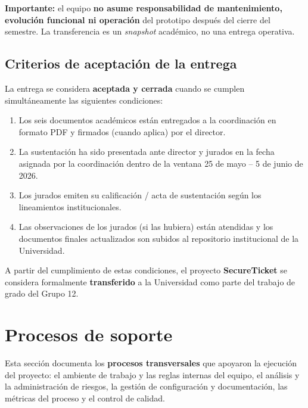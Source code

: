 \documentclass[12pt,oneside]{report}
\newcommand{\projectname}{SecureTicket}
\begin{document}
      \textbf{Importante:} el equipo \textbf{no asume responsabilidad de mantenimiento, evolución funcional ni operación} del prototipo después del cierre del semestre. La transferencia es un \textit{snapshot} académico, no una entrega operativa.

    \subsection{Criterios de aceptación de la entrega}
    \label{subsec:aceptacion-entrega}

      La entrega se considera \textbf{aceptada y cerrada} cuando se cumplen simultáneamente las siguientes condiciones:
      \begin{enumerate}
        \item Los seis documentos académicos están entregados a la coordinación en formato PDF y firmados (cuando aplica) por el director.
        \item La sustentación ha sido presentada ante director y jurados en la fecha asignada por la coordinación dentro de la ventana 25 de mayo -- 5 de junio de 2026.
        \item Los jurados emiten su calificación / acta de sustentación según los lineamientos institucionales.
        \item Las observaciones de los jurados (si las hubiera) están atendidas y los documentos finales actualizados son subidos al repositorio institucional de la Universidad.
      \end{enumerate}

      A partir del cumplimiento de estas condiciones, el proyecto \textbf{\projectname} se considera formalmente \textbf{transferido} a la Universidad como parte del trabajo de grado del Grupo 12.

  \section{Procesos de soporte}
  \label{sec:procesos-soporte}

    Esta sección documenta los \textbf{procesos transversales} que apoyaron la ejecución del proyecto: el ambiente de trabajo y las reglas internas del equipo, el análisis y la administración de riesgos, la gestión de configuración y documentación, las métricas del proceso y el control de calidad.
\end{document}
